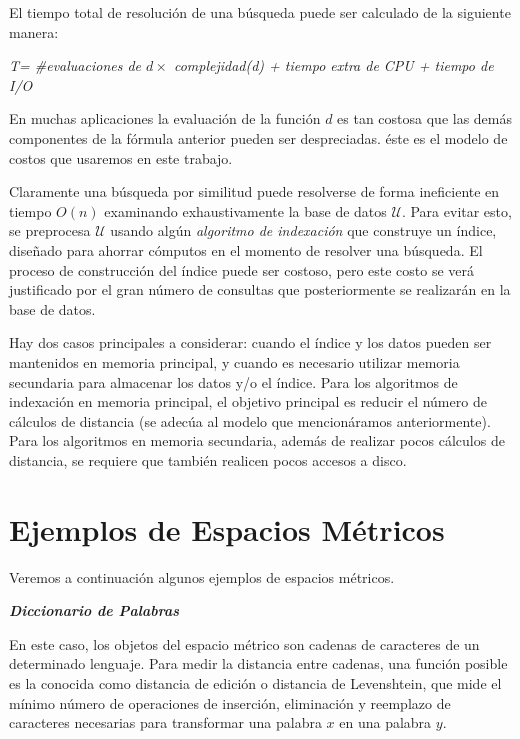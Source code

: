 El tiempo total de resoluci\'on de una b\'usqueda puede ser calculado de la
siguiente manera:

\centerline{
    \em T= \#evaluaciones  de $d \times $ complejidad(d) +  tiempo extra de
    CPU + tiempo de  I/O
}

En muchas aplicaciones  la evaluaci\'on de la funci\'on $d$ es tan costosa
que las dem\'as componentes de la f\'ormula anterior pueden ser despreciadas.
\'este es el modelo de costos  que usaremos en este trabajo.

Claramente una b\'usqueda por similitud puede resolverse de forma
ineficiente en tiempo  $O(n)$ examinando exhaustivamente la base de datos $\mathcal{U}$.
Para evitar esto, se preprocesa $\mathcal{U}$ usando alg\'un {\em algoritmo de
indexaci\'on} que construye  un 
\'indice, dise\~nado  para ahorrar c\'omputos en el momento de resolver una b\'usqueda.
El proceso de  construcci\'on del \'indice puede ser costoso, pero este costo
se ver\'a justificado por el gran n\'umero de consultas que posteriormente se
realizar\'an en la base de datos.

Hay dos casos principales a considerar: cuando el \'indice y los datos pueden ser
mantenidos en memoria principal, y cuando es necesario utilizar memoria secundaria
para almacenar los datos y/o el \'indice. Para los algoritmos de indexaci\'on
en memoria principal, el objetivo principal es reducir el n\'umero de c\'alculos de distancia
(se adec\'ua al modelo que mencion\'aramos anteriormente).
  Para los algoritmos en memoria secundaria, adem\'as
de realizar pocos c\'alculos de distancia, se requiere que tambi\'en realicen
pocos accesos a disco. 


\section{Ejemplos de Espacios M\'etricos}

Veremos a continuaci\'on algunos ejemplos de espacios m\'etricos.

\noindent \textit{\textbf{Diccionario de Palabras}}

En este caso, los objetos del espacio m\'etrico son cadenas de caracteres de un determinado 
lenguaje. Para medir la distancia entre cadenas, una funci\'on posible es la conocida como 
distancia de edici\'on o distancia de Levenshtein, que mide el m\'inimo n\'umero de operaciones
 de inserci\'on, eliminaci\'on y reemplazo de caracteres necesarias  para transformar una palabra $x$ 
 en una palabra $y$. 



